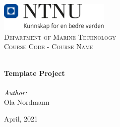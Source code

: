 
\begin{titlepage}
\vbox{ }
\vbox{ }
\begin{center}
\includegraphics[width=0.40\textwidth]{Images/NTNU_logo.png}\\[1cm]
\textsc{\LARGE Department of Marine Technology}\\[1.5cm]
\textsc{\Large Course Code - Course Name}\\[0.5cm]
\vbox{ }

\HRule \\[0.4cm]
{ \huge \bfseries Template Project}\\[0.4cm]
\HRule \\[1.5cm]

\large
\emph{Author:}\\
Ola Nordmann
\vfill

{\large April, 2021}
\end{center}
\end{titlepage}